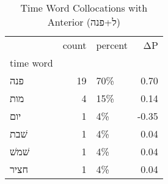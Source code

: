 \begin{table}[htbp!]
\centering
\caption{Time Word Collocations with Anterior (ל+פנה)}
\label{table:antל+פנה_head_cpd}
\begin{tabular}{lrlr}
\toprule
{} &  count & percent &    ΔP \\
time word &        &         &       \\
\midrule
פנה       &     19 &     70\% &  0.70 \\
מות       &      4 &     15\% &  0.14 \\
יום       &      1 &      4\% & -0.35 \\
שׁבת      &      1 &      4\% &  0.04 \\
שׁמשׁ     &      1 &      4\% &  0.04 \\
חציר      &      1 &      4\% &  0.04 \\
\bottomrule
\end{tabular}
\end{table}
